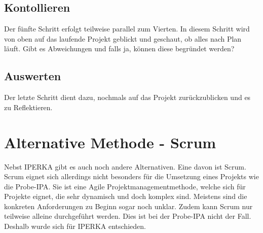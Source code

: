 \subsection{Kontollieren}
Der fünfte Schritt erfolgt teilweise parallel zum Vierten. In diesem Schritt wird von oben auf das laufende Projekt geblickt und geschaut, ob alles nach Plan läuft. Gibt es Abweichungen und falls ja, können diese begründet werden?

\subsection{Auswerten}
Der letzte Schritt dient dazu, nochmals auf das Projekt zurückzublicken und es zu Reflektieren.

\section{Alternative Methode - Scrum}\label{sec:alternative-methode}
Nebst IPERKA gibt es auch noch andere Alternativen. Eine davon ist Scrum. 
Scrum eignet sich allerdings nicht besonders für die Umsetzung eines Projekts wie die Probe-IPA.  Sie ist eine Agile Projektmanagementmethode, welche sich für Projekte eignet, die sehr dynamisch und doch komplex sind. Meistens sind die konkreten Anforderungen zu Beginn sogar noch unklar. Zudem kann Scrum nur teilweise alleine durchgeführt werden.
Dies ist bei der Probe-IPA nicht der Fall. Deshalb wurde sich für IPERKA entschieden.